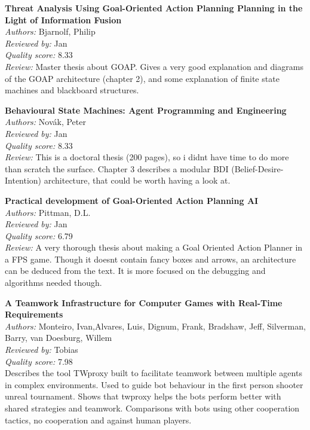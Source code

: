 {\textbf{Threat Analysis Using Goal-Oriented Action Planning Planning in the Light of Information Fusion\cite{Bjarnolf2008}}\\
\textit{Authors:} Bjarnolf, Philip\\
\textit{Reviewed by:} Jan\\
\textit{Quality score:} 8.33\\
\textit{Review:} Master thesis about GOAP. Gives a very good explanation and diagrams of the GOAP architecture (chapter 2), and some explanation of finite state machines and blackboard structures. 

\textbf{Behavioural State Machines: Agent Programming and Engineering\cite{Novak2009}}\\
\textit{Authors:} Nov\'{a}k, Peter\\
\textit{Reviewed by:} Jan\\
\textit{Quality score:} 8.33\\
\textit{Review:} This is a doctoral thesis (200 pages), so i didnt have time to do more than scratch the surface. Chapter 3 describes a modular BDI (Belief-Desire-Intention) architecture, that could be worth having a look at.


\textbf{Practical development of Goal-Oriented Action Planning AI\cite{Pittman}}\\
\textit{Authors:} Pittman, D.L.\\
\textit{Reviewed by:} Jan\\
\textit{Quality score:} 6.79\\
\textit{Review:} A very thorough thesis about making a Goal Oriented Action Planner in a FPS game. Though it doesnt contain fancy boxes and arrows, an architecture can be deduced from the text. It is more focused on the debugging and algorithms needed though.

\textbf{A Teamwork Infrastructure for Computer Games with Real-Time Requirements\cite{monteiro2009teamwork}}\\
\textit{Authors:} Monteiro, Ivan,Alvares, Luis, Dignum, Frank, Bradshaw, Jeff, Silverman, Barry, van Doesburg, Willem\\
\textit{Reviewed by:} Tobias\\
\textit{Quality score:} 7.98\\
Describes the tool TWproxy built to facilitate teamwork between multiple agents in complex environments. Used to guide bot behaviour in the first person shooter unreal tournament. Shows that twproxy helps the bots perform better with shared strategies and teamwork. Comparisons with bots using other cooperation tactics, no cooperation and against human players.

}
